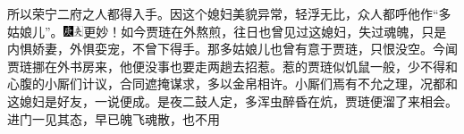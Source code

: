 {所以荣宁二府之人都得入手。因这个媳妇美貌异常，轻浮无比，众人都呼他作``多姑娘儿''。{\includegraphics[width=3mm]{../Images/00004}\includegraphics[width=3mm]{../Images/00012}\footnotesize \kaishu 更妙！}如今贾琏在外熬煎，往日也曾见过这媳妇，失过魂魄，只是内惧娇妻，外惧娈宠，不曾下得手。那多姑娘儿也曾有意于贾琏，只恨没空。今闻贾琏挪在外书房来，他便没事也要走两趟去招惹。惹的贾琏似饥鼠一般，少不得和心腹的小厮们计议，合同遮掩谋求，多以金帛相许。小厮们焉有不允之理，况都和这媳妇是好友，一说便成。是夜二鼓人定，多浑虫醉昏在炕，贾琏便溜了来相会。进门一见其态，早已魄飞魂散，也不用}
